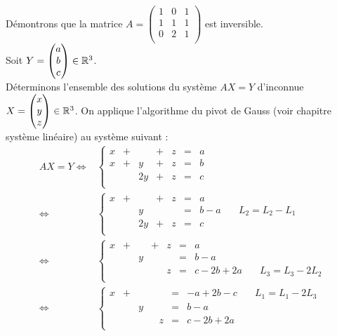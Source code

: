\documentclass{book}
\begin{document}
\begin{Exemple}
Démontrons que la matrice $A =\begin{pmatrix}
1& 0&1\\
1& 1 &1\\
0& 2 &1\\
\end{pmatrix}$ est inversible. \\
Soit $Y=\begin{pmatrix}
a\\b\\c\\
\end{pmatrix}\in \R^3$.\\
Déterminons l'ensemble des solutions du système $AX=Y$ d'inconnue $X=\begin{pmatrix}
x\\y\\z\\
\end{pmatrix}\in \R^3$. On applique l'algorithme du pivot de Gauss (voir chapitre système linéaire) au système suivant :
$$\begin{aligned}
AX=Y \Leftrightarrow& \left\{\begin{matrix}
x &+&   &+& z&=& a\\
x &+& y &+&z&=&b\\
 && 2y  &+&z&=& c\\
     \end{matrix}\right.\\
     \Leftrightarrow&
     \left\{\begin{matrix}
x &+&   &+& z&=& a&\\
 && y & &  &=&b-a&\quad L_2=L_2-L_1\\
 && 2y  &+&z&=& c&\\
     \end{matrix}
\right.\\
     \Leftrightarrow&
     \left\{\begin{matrix}
x &+&   &+& z&=& a&\\
 && y & &  &=&b-a&\\
 &&  &&z&=& c-2b+2a&\quad L_3=L_3-2L_2\\
     \end{matrix}
\right.\\
     \Leftrightarrow&
     \left\{\begin{matrix}
x &+&   && &=& -a+2b-c&\quad L_1=L_1-2L_3\\
 && y & &  &=&b-a&\\
 &&  &&z&=& c-2b+2a&\\

\end{matrix}
\end{aligned}$$
\end{Exemple}
\end{document}
